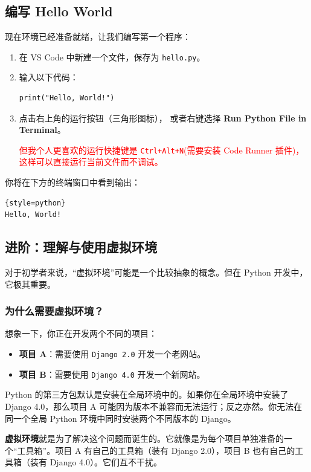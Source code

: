 \newpage

\subsection{编写 Hello World}
现在环境已经准备就绪，让我们编写第一个程序：
\begin{enumerate}
    \item 在 VS Code 中新建一个文件，保存为 \texttt{hello.py}。
    \item 输入以下代码：
\begin{verbatim}
print("Hello, World!")
\end{verbatim}
    \item 点击右上角的运行按钮（三角形图标），
    或者右键选择 \textbf{Run Python File in Terminal}。

    \textcolor{red}{但我个人更喜欢的运行快捷键是 \texttt{Ctrl+Alt+N}(需要安装 Code Runner 插件)，
    这样可以直接运行当前文件而不调试。}

\end{enumerate}

你将在下方的终端窗口中看到输出：
\begin{lstlisting}{style=python}
Hello, World!
\end{lstlisting}

\newpage 
\subsection{进阶：理解与使用虚拟环境}

对于初学者来说，“虚拟环境”可能是一个比较抽象的概念。但在 Python 开发中，它极其重要。

\subsubsection{为什么需要虚拟环境？}
想象一下，你正在开发两个不同的项目：
\begin{itemize}
    \item \textbf{项目 A}：需要使用 \texttt{Django 2.0} 开发一个老网站。
    \item \textbf{项目 B}：需要使用 \texttt{Django 4.0} 开发一个新网站。
\end{itemize}
Python 的第三方包默认是安装在全局环境中的。如果你在全局环境中安装了 Django 4.0，那么项目 A 可能因为版本不兼容而无法运行；反之亦然。你无法在同一个全局 Python 环境中同时安装两个不同版本的 Django。

\textbf{虚拟环境}就是为了解决这个问题而诞生的。它就像是为每个项目单独准备的一个“工具箱”。项目 A 有自己的工具箱（装有 Django 2.0），项目 B 也有自己的工具箱（装有 Django 4.0）。它们互不干扰。

